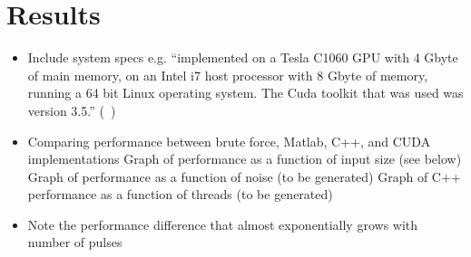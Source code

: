 \section{Results}\label{sec:results}

\begin{itemize}
  \item Include system specs e.g. ``implemented on a Tesla
    C1060 GPU with 4 Gbyte of main memory, on an Intel i7 host
    processor with 8 Gbyte of memory, running a 64 bit Linux
    operating system. The Cuda toolkit that was used was version
    3.5.'' (~\cite{gpu-sar})
  \item Comparing performance between brute force, Matlab, C++, and CUDA implementations
    \subitem Graph of performance as a function of input size (see below)
    \subitem Graph of performance as a function of noise (to be generated)
    \subitem Graph of C++ performance as a function of threads (to be generated)
  \item Note the performance difference that almost exponentially grows with number of pulses
\end{itemize}
